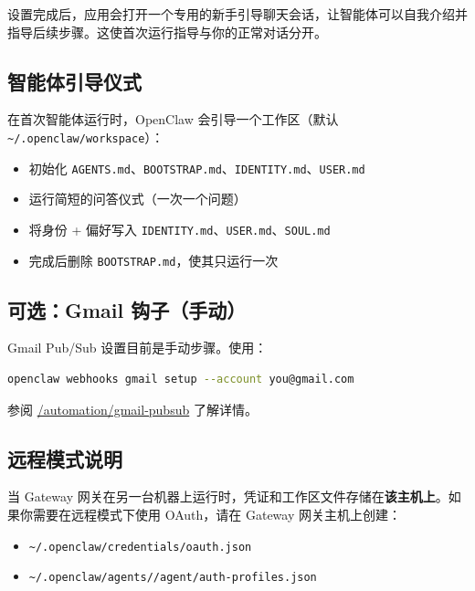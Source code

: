 设置完成后，应用会打开一个专用的新手引导聊天会话，让智能体可以自我介绍并指导后续步骤。这使首次运行指导与你的正常对话分开。

\subsection{智能体引导仪式}


在首次智能体运行时，OpenClaw 会引导一个工作区（默认 \texttt{\textasciitilde{}/.openclaw/workspace}）：

\begin{itemize}
  \item 初始化 \texttt{AGENTS.md}、\texttt{BOOTSTRAP.md}、\texttt{IDENTITY.md}、\texttt{USER.md}
  \item 运行简短的问答仪式（一次一个问题）
  \item 将身份 + 偏好写入 \texttt{IDENTITY.md}、\texttt{USER.md}、\texttt{SOUL.md}
  \item 完成后删除 \texttt{BOOTSTRAP.md}，使其只运行一次
\end{itemize}


\subsection{可选：Gmail 钩子（手动）}


Gmail Pub/Sub 设置目前是手动步骤。使用：

\begin{lstlisting}[language=bash]
openclaw webhooks gmail setup --account you@gmail.com
\end{lstlisting}


参阅 \href{/automation/gmail-pubsub}{/automation/gmail-pubsub} 了解详情。

\subsection{远程模式说明}


当 Gateway 网关在另一台机器上运行时，凭证和工作区文件存储在\textbf{该主机上}。如果你需要在远程模式下使用 OAuth，请在 Gateway 网关主机上创建：

\begin{itemize}
  \item \texttt{\textasciitilde{}/.openclaw/credentials/oauth.json}
  \item \texttt{\textasciitilde{}/.openclaw/agents//agent/auth-profiles.json}
\end{itemize}



